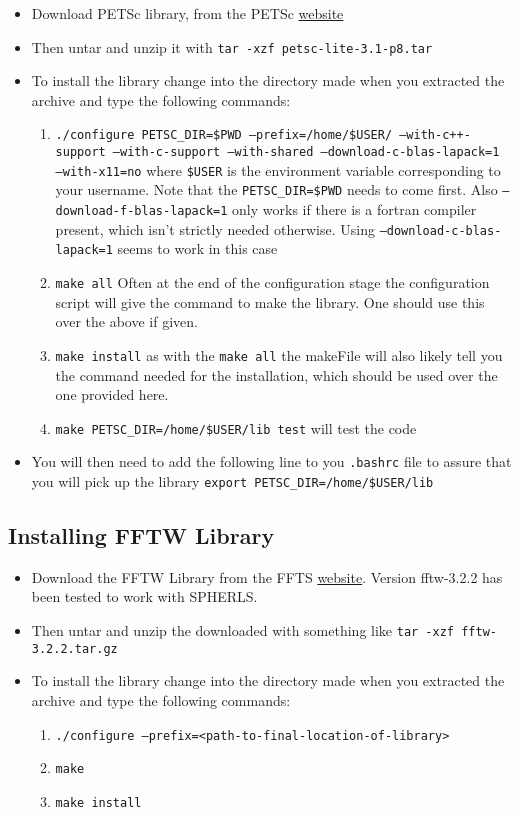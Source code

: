 \documentclass[12pt,a4paper]{book}
\begin{document}
\begin{itemize}
\item Download PETSc library, from the PETSc \href{http://www.mcs.anl.gov/petsc/download/index.html}{website}
\item Then untar and unzip it with {\tt tar -xzf petsc-lite-3.1-p8.tar}
\item To install the library change into the directory made when you extracted the archive and type the following commands:
\begin{enumerate}
\item {\tt ./configure PETSC\_DIR=\$PWD --prefix=/home/\$USER/ --with-c++-support --with-c-support --with-shared --download-c-blas-lapack=1 --with-x11=no} where {\tt \$USER} is the environment variable corresponding to your username.  Note that the {\tt PETSC\_DIR=\$PWD} needs to come first. Also {\tt --download-f-blas-lapack=1} only works if there is a fortran compiler present, which isn't strictly needed otherwise. Using {\tt --download-c-blas-lapack=1} seems to work in this case
\item {\tt make all} Often at the end of the configuration stage the configuration script will give the command to make the library. One should use this over the above if given.
\item {\tt make install} as with the {\tt make all} the makeFile will also likely tell you the command needed for the installation, which should be used over the one provided here.
\item {\tt make PETSC\_DIR=/home/\$USER/lib test} will test the code
\end{enumerate}
\item You will then need to add the following line to you {\tt .bashrc} file to assure that you will pick up the library {\tt export PETSC\_DIR=/home/\$USER/lib}
\end{itemize}

\subsection{Installing FFTW Library}
\begin{itemize}
\item Download the FFTW Library from the FFTS \href{http://www.fftw.org/download.html}{website}. Version fftw-3.2.2 has been tested to work with SPHERLS.
\item Then untar and unzip the downloaded with something like {\tt tar -xzf fftw-3.2.2.tar.gz}
\item To install the library change into the directory made when you extracted the archive and type the following commands:
\begin{enumerate}
\item {\tt ./configure --prefix=<path-to-final-location-of-library>}
\item {\tt make}
\item {\tt make install}
\end{enumerate}
\end{itemize}
\end{document}
